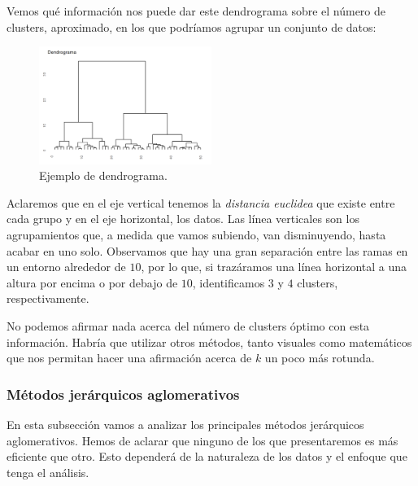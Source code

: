 \begin{ejemplo}

    Vemos qué información nos puede dar este dendrograma sobre el número de clusters, aproximado, en los que podríamos agrupar un conjunto de datos:

    \begin{figure}[h]
        \centering
        \includegraphics[width=0.5\textwidth]{../img/dendrograma-1.png}
        \caption{Ejemplo de dendrograma.}
    \end{figure}

    \FloatBarrier

    Aclaremos que en el eje vertical tenemos la \textit{distancia euclidea} que existe entre cada grupo y en el eje horizontal, los datos. Las línea verticales son los
    agrupamientos que, a medida que vamos subiendo, van disminuyendo, hasta acabar en uno solo. Observamos que hay una gran separación entre las ramas en un entorno alrededor
    de $10$, por lo que, si trazáramos una línea horizontal a una altura por encima o por debajo de $10$, identificamos $3$ y $4$ clusters, respectivamente. \newline

    No podemos afirmar nada acerca del número de clusters óptimo con esta información. Habría que utilizar otros métodos, tanto visuales como matemáticos que nos permitan
    hacer una afirmación acerca de $k$ un poco más rotunda.

\end{ejemplo}


\subsubsection{Métodos jerárquicos aglomerativos}  %

En esta subsección vamos a analizar los principales métodos jerárquicos aglomerativos. Hemos de aclarar que ninguno de los que presentaremos es más eficiente que otro. Esto 
dependerá de la naturaleza de los datos y el enfoque que tenga el análisis. \newline

